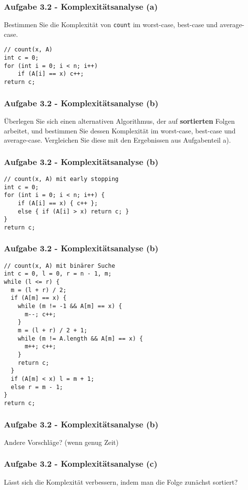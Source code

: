\documentclass{beamer}
\begin{document}
\begin{frame}[t, fragile]
	\frametitle{Aufgabe 3.2 - Komplexitätsanalyse (a)}
	Bestimmen Sie die Komplexität von \texttt{count} im worst-case, best-case und average-case.
	\medskip
	\begin{verbatim}
// count(x, A)
int c = 0;
for (int i = 0; i < n; i++)
	if (A[i] == x) c++;
return c;
	\end{verbatim}
\end{frame}

\begin{frame}[t]
	\frametitle{Aufgabe 3.2 - Komplexitätsanalyse (b)}
	Überlegen Sie sich einen alternativen Algorithmus, der auf \textbf{sortierten} Folgen arbeitet,
	und bestimmen Sie dessen Komplexität im worst-case, best-case und average-case.
	Vergleichen Sie diese mit den Ergebnissen aus Aufgabenteil a).
\end{frame}

\begin{frame}[t, fragile]
	\frametitle{Aufgabe 3.2 - Komplexitätsanalyse (b)}
	\begin{verbatim}
// count(x, A) mit early stopping
int c = 0;
for (int i = 0; i < n; i++) {
	if (A[i] == x) { c++ };
	else { if (A[i] > x) return c; }
}
return c;
	\end{verbatim}
\end{frame}

\begin{frame}[t, fragile]
	\frametitle{Aufgabe 3.2 - Komplexitätsanalyse (b)}
	\begin{verbatim}
// count(x, A) mit binärer Suche 
int c = 0, l = 0, r = n - 1, m;
while (l <= r) {
  m = (l + r) / 2;
  if (A[m] == x) {
    while (m != -1 && A[m] == x) {
      m--; c++;
    }
    m = (l + r) / 2 + 1;
    while (m != A.length && A[m] == x) {
      m++; c++;
    }
    return c;
  }
  if (A[m] < x) l = m + 1;
  else r = m - 1;
}
return c;
	\end{verbatim}
\end{frame}

\begin{frame}[t]
	\frametitle{Aufgabe 3.2 - Komplexitätsanalyse (b)}
	Andere Vorschläge? (wenn genug Zeit)
\end{frame}

\begin{frame}[t]
	\frametitle{Aufgabe 3.2 - Komplexitätsanalyse (c)}
	Lässt sich die Komplexität verbessern, indem man die Folge zunächst sortiert?
\end{frame}
\end{document}
